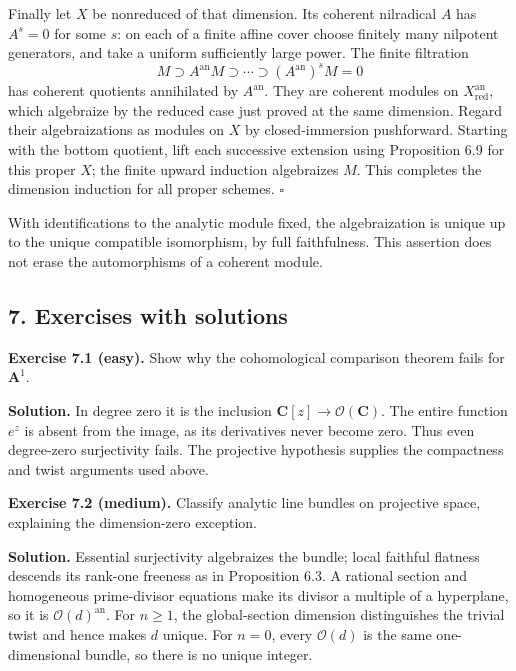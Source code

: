 \documentclass[11pt]{article}
\begin{document}
Finally let \(X\) be nonreduced of that dimension. Its coherent
nilradical \(A\) has \(A^s=0\) for some \(s\): on each of a finite
affine cover choose finitely many nilpotent generators, and take a
uniform sufficiently large power. The finite filtration \[
M\supset A^{\mathrm{an}}M\supset\cdots\supset(A^{\mathrm{an}})^sM=0
\] has coherent quotients annihilated by \(A^{\mathrm{an}}\). They are
coherent modules on \(X_{\mathrm{red}}^{\mathrm{an}}\), which algebraize
by the reduced case just proved at the same dimension. Regard their
algebraizations as modules on \(X\) by closed-immersion pushforward.
Starting with the bottom quotient, lift each successive extension using
Proposition 6.9 for this proper \(X\); the finite upward induction
algebraizes \(M\). This completes the dimension induction for all proper
schemes. \(\square\)

With identifications to the analytic module fixed, the algebraization is
unique up to the unique compatible isomorphism, by full faithfulness.
This assertion does not erase the automorphisms of a coherent module.

\subsection{7. Exercises with solutions}\label{exercises-with-solutions}

\textbf{Exercise 7.1 (easy).} Show why the cohomological comparison
theorem fails for \(\mathbf A^1\).

\textbf{Solution.} In degree zero it is the inclusion
\(\mathbf C[z]\to\mathcal O(\mathbf C)\). The entire function \(e^z\) is
absent from the image, as its derivatives never become zero. Thus even
degree-zero surjectivity fails. The projective hypothesis supplies the
compactness and twist arguments used above.

\textbf{Exercise 7.2 (medium).} Classify analytic line bundles on
projective space, explaining the dimension-zero exception.

\textbf{Solution.} Essential surjectivity algebraizes the bundle; local
faithful flatness descends its rank-one freeness as in Proposition 6.3.
A rational section and homogeneous prime-divisor equations make its
divisor a multiple of a hyperplane, so it is
\(\mathcal O(d)^{\mathrm{an}}\). For \(n\geq1\), the global-section
dimension distinguishes the trivial twist and hence makes \(d\) unique.
For \(n=0\), every \(\mathcal O(d)\) is the same one-dimensional bundle,
so there is no unique integer.
\end{document}

